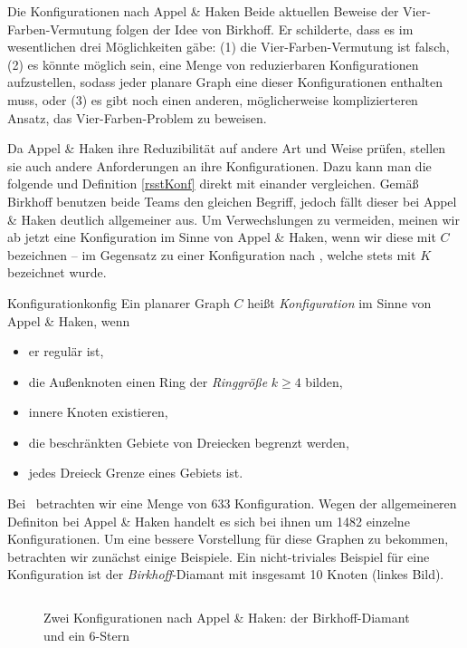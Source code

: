   \begin{section}{Die Konfigurationen nach Appel \& Haken}
  Beide aktuellen Beweise der Vier-Farben-Vermutung folgen der Idee von Birkhoff. Er schilderte, dass es im wesentlichen drei Möglichkeiten gäbe: (1) die Vier-Farben-Vermutung ist falsch, (2) es könnte möglich sein, eine Menge von reduzierbaren Konfigurationen aufzustellen, sodass jeder planare Graph eine dieser Konfigurationen enthalten muss, oder (3) es gibt noch einen anderen, möglicherweise komplizierteren Ansatz, das Vier-Farben-Problem zu beweisen. \cite{AH1}
   
   Da Appel \& Haken ihre Reduzibilität auf andere Art und Weise prüfen, stellen sie auch andere Anforderungen an ihre Konfigurationen. Dazu kann man die folgende und Definition \ref{rsstKonf} direkt mit einander vergleichen. Gemäß Birkhoff benutzen beide Teams den gleichen Begriff, jedoch fällt dieser bei Appel \& Haken deutlich allgemeiner aus. Um Verwechslungen zu vermeiden, meinen wir ab jetzt eine Konfiguration im Sinne von Appel \& Haken, wenn wir diese mit $C$ bezeichnen -- im Gegensatz zu einer Konfiguration nach \rsst, welche stets mit $K$ bezeichnet wurde.
   
   \begin{definitionl}{Konfiguration}{konfig}
    Ein planarer Graph $C$ heißt \textit{Konfiguration} im Sinne von Appel \& Haken, wenn
    \begin{itemize}
     \item er regulär ist,
     \item die Außenknoten einen Ring der \textit{Ringgröße} $k \geq 4$ bilden,
     \item innere Knoten existieren,
     \item die beschränkten Gebiete von Dreiecken begrenzt werden,
     \item jedes Dreieck Grenze eines Gebiets ist.
    \end{itemize}
   \end{definitionl}
   
   Bei \rsst\-\ betrachten wir eine Menge von 633 Konfiguration. Wegen der allgemeineren Definiton bei Appel \& Haken handelt es sich bei ihnen um 1482 einzelne Konfigurationen. Um eine bessere Vorstellung für diese Graphen zu bekommen, betrachten wir zunächst einige Beispiele. Ein nicht-triviales Beispiel für eine Konfiguration ist der \textit{Birkhoff}-Diamant mit insgesamt 10 Knoten (linkes Bild).
   
  \begin{figure}[hb]
   \label{AHkonfig}
    \[  \]
    \caption[Zwei Konfigurationen nach Appel \& Haken: der Birkhoff-Diamant und ein $6$-Stern]{Zwei Konfigurationen nach Appel \& Haken: der Birkhoff-Diamant und ein $6$-Stern}
  \end{figure}
   

\end{section}
